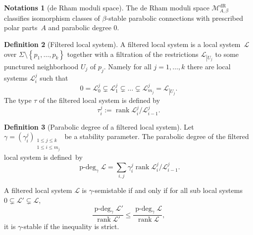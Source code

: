 \documentclass[JEP,XML,SOM,NoEqCountersInSection,Unicode,published]{cedram}
\newcommand{\dR}{\mathrm{dR}}
\theoremstyle{definition}
\newtheorem{definition}{Definition}[section]
\newtheorem{notations}[definition]{Notations}
\theoremstyle{plain}
\DeclareMathOperator{\rank}{rank}
\DeclareMathOperator{\pdeg}{p-deg}
\begin{document}
\begin{notations}[de Rham moduli space]
The de Rham moduli space $\mathcal{M}^{\dR}_{A,\beta}$ classifies isomorphism classes of $\beta$-stable parabolic connections with prescribed polar parts~$A$ and parabolic degree $0$.
\end{notations}

\label{subsect_resol_filtered_local}
\begin{definition}[Filtered local system]
A filtered local system is a local system~$\mathcal{L}$ over $\Sigma\setminus\left\lbrace p_1,\dots,p_k\right\rbrace$ together with a filtration of the restrictions $\mathcal{L}_{\left|U_j\right.}$ to some punctured neighborhood $U_j$ of $p_j$. Namely for all $j=1,\dots,k$ there are local systems $\mathcal{L}^j_i$ such that
\[
0 = \mathcal{L}^j_0 \subsetneq \mathcal{L}^j_1 \subsetneq \dots\subsetneq \mathcal{L}^j_{m_j} = \mathcal{L}_{\left|U_j\right.}.
\]
The type $\tau$ of the filtered local system is defined by
\[
\tau^j_i := \rank \mathcal{L}^j_i/ \mathcal{L}^j_{i-1}.
\]
\end{definition}

\begin{definition}[Parabolic degree of a filtered local system]
Let $\gamma =(\gamma^j_i)_{\substack{1\le j \le k \\ 1 \le i \le m_j}}$ be a stability parameter. The parabolic degree of the filtered local system is defined~by
\[
\pdeg_{\gamma} \mathcal{L} = \sum_{i,j} \gamma^j_i \rank \mathcal{L}^j_i / \mathcal{L}^j_{i-1}.
\]
\end{definition}

A filtered local system $\mathcal{L}$ is $\gamma$-semistable if and only if for all sub local systems $ 0 \subsetneq \mathcal{L}' \subsetneq \mathcal{L}$,
\[
\frac{\pdeg_{\gamma} \mathcal{L}'}{\rank \mathcal{L}'} \le \frac{\pdeg_{\gamma} \mathcal{L}}{\rank \mathcal{L}},
\]
it is $\gamma$-stable if the inequality is strict.
\end{document}
